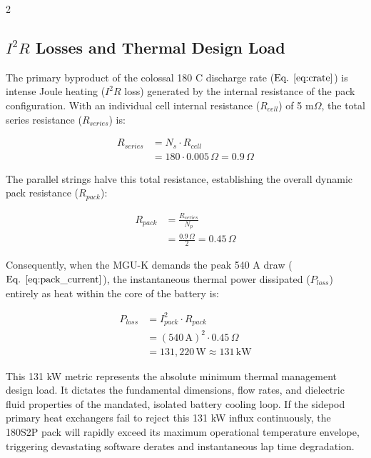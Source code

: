 \begin{multicols}{2}
\subsection{$I^2R$ Losses and Thermal Design Load}

The primary byproduct of the colossal 180 C discharge rate ($\text{Eq. } \ref{eq:crate}$) is intense Joule heating ($I^2R$ loss) generated by the internal resistance of the pack configuration. With an individual cell internal resistance ($R_{cell}$) of 5 m$\Omega$, the total series resistance ($R_{series}$) is:

\begin{equation} \label{eq:series_res}
\begin{split}
R_{series} &= N_s \cdot R_{cell} \\
&= 180 \cdot 0.005\,\Omega = 0.9\,\Omega
\end{split}
\end{equation}

The parallel strings halve this total resistance, establishing the overall dynamic pack resistance ($R_{pack}$):

\begin{equation} \label{eq:pack_res}
\begin{split}
R_{pack} &= \frac{R_{series}}{N_p} \\
&= \frac{0.9\,\Omega}{2} = 0.45\,\Omega
\end{split}
\end{equation}

Consequently, when the MGU-K demands the peak 540 A draw ($\text{Eq. } \ref{eq:pack_current}$), the instantaneous thermal power dissipated ($P_{loss}$) entirely as heat within the core of the battery is:

\begin{equation} \label{eq:thermal_loss}
\begin{split}
P_{loss} &= I_{pack}^2 \cdot R_{pack} \\
&= (540\,\mathrm{A})^2 \cdot 0.45\,\Omega \\
&= 131,220\,\mathrm{W} \approx 131\,\mathrm{kW}
\end{split}
\end{equation}

This 131 kW metric represents the absolute minimum thermal management design load. It dictates the fundamental dimensions, flow rates, and dielectric fluid properties of the mandated, isolated battery cooling loop. If the sidepod primary heat exchangers fail to reject this 131 kW influx continuously, the 180S2P pack will rapidly exceed its maximum operational temperature envelope, triggering devastating software derates and instantaneous lap time degradation.


\end{multicols}

